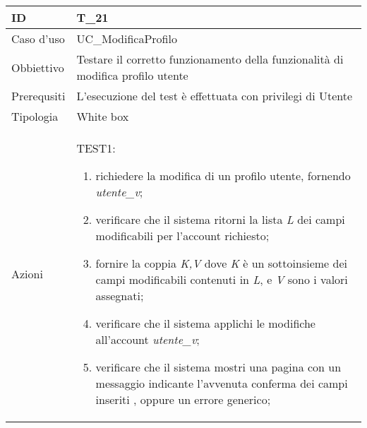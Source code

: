 \begin{table}[hb]
    \centering
    \begin{tabular}{ |p{2cm}|p{10cm}|  }
        \hline
        ID          & T\_21                                                                           \\\hline
        Caso d'uso  & UC\_ModificaProfilo                                                             \\\hline
        Obbiettivo  & Testare il corretto funzionamento della funzionalità di modifica profilo utente \\\hline
        Prerequsiti & L'esecuzione del test è effettuata con privilegi di Utente                      \\\hline
        Tipologia   & White box                                                                       \\\hline
        Azioni      &
        TEST1:
        \begin{enumerate}[nosep, topsep=0pt]
            \item richiedere la modifica di un profilo utente, fornendo \emph{utente\_v};
            \item verificare che il sistema ritorni la lista \emph{L} dei campi modificabili per l'account richiesto;
            \item fornire la coppia \emph{K,V} dove \emph{K} è un sottoinsieme dei campi modificabili contenuti in \emph{L}, e \emph{V} sono i valori assegnati;
            \item verificare che il sistema applichi le modifiche all'account \emph{utente\_v};
            \item verificare che il sistema mostri una pagina con un messaggio indicante l'avvenuta conferma dei campi inseriti , oppure un errore generico;
        \end{enumerate}
        \\\hline
    \end{tabular}
\end{table}

